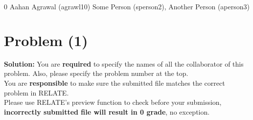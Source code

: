\documentclass[../main.tex]{subfiles}
\begin{document}
\homework
    {0}
    {Aahan Agrawal (agrawl10)}
    {Some Person (sperson2), Another Person (aperson3)}

\section*{Problem (1)}
\textbf{Solution:} You are \textbf{required} to specify the names of all the collaborator of this problem.
Also, please specify the problem number at the top.\\
You are \textbf{responsible} to make
 sure the submitted file matches the correct problem in RELATE.
\\Please use RELATE's preview function to check before your submission,
\textbf{incorrectly submitted file will result in 0 grade}, no exception.\\





\newpage \nocite{*}


\end{document}
